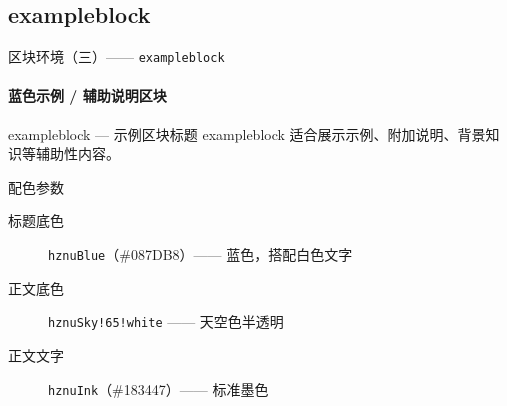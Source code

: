 \documentclass[10pt,aspectratio=169]{beamer}
\begin{document}
\subsection{exampleblock}
\begin{frame}{区块环境（三）—— \texttt{exampleblock}}
  \framesubtitle{蓝色示例 / 辅助说明区块}

  \begin{exampleblock}{exampleblock — 示例区块标题}
    exampleblock 适合展示示例、附加说明、背景知识等辅助性内容。
  \end{exampleblock}

  \vspace{.3cm}
  \begin{block}{配色参数}
    \begin{description}
      \item[标题底色] \texttt{hznuBlue}（\#087DB8）—— 蓝色，搭配白色文字
      \item[正文底色] \texttt{hznuSky!65!white} —— 天空色半透明
      \item[正文文字] \texttt{hznuInk}（\#183447）—— 标准墨色
    \end{description}
  \end{block}

  
\end{frame}

\end{document}
